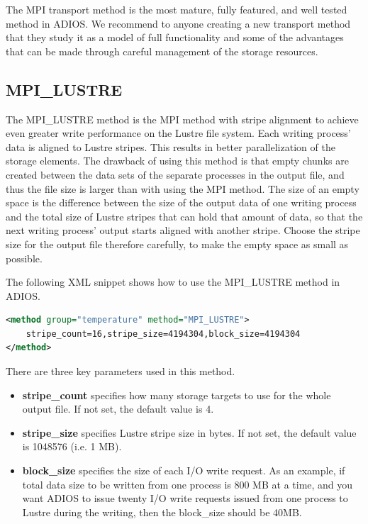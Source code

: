 The MPI transport method is the most mature, fully featured, and well tested method 
in ADIOS. We recommend to anyone creating a new transport method that they study 
it as a model of full functionality and some of the advantages that can be made 
through careful management of the storage resources.

\subsection{MPI\_LUSTRE}

The MPI\_LUSTRE method is the MPI method with stripe alignment to achieve even 
greater write performance on the Lustre file system. Each writing process' data 
is aligned to Lustre stripes. This results in better parallelization of the storage 
elements. The drawback of using this method is that empty chunks are created between 
the data sets of the separate processes in the output file, and thus the file size 
is larger than with using the MPI method. The size of an empty space is the difference 
between the size of the output data of one writing process and the total size of 
Lustre stripes that can hold that amount of data, so that the next writing process' 
output starts aligned with another stripe. Choose the stripe size for the output 
file therefore carefully, to make the empty space as small as possible. 

The following XML snippet shows how to use the MPI\_LUSTRE method in ADIOS. 
\begin{lstlisting}[language=XML]
<method group="temperature" method="MPI_LUSTRE">
	stripe_count=16,stripe_size=4194304,block_size=4194304 
</method>
\end{lstlisting}

There are three key parameters used in this method.
\begin{itemize}
\item \textbf{stripe\_count} specifies how many storage targets to 
use for the whole output file. If not set, the default value is 4.

\item \textbf{stripe\_size}  specifies Lustre stripe size in bytes. 
If not set, the default value is 1048576 (i.e. 1 MB).

\item \textbf{block\_size}   specifies the size of each I/O write 
request. As an example, if total data size to be written from one process is 800 
MB at a time, and you want ADIOS to issue twenty I/O write requests issued from 
one process to Lustre during the writing, then the block\_size should be 40MB.
\end{itemize}


